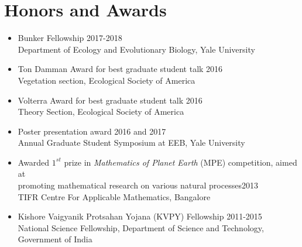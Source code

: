 \documentclass[11pt,a4paper,sans]{moderncv}        %
\begin{document}
\section{Honors and Awards}
\begin{itemize}

\item Bunker Fellowship \hfill 2017-2018\\ 
{\footnotesize Department of Ecology and Evolutionary Biology, Yale University}\\

\item Ton Damman Award for best graduate student talk  \hfill 2016\\ 
{\footnotesize Vegetation section, Ecological Society of America}\\

\item Volterra Award for best graduate student talk \hfill 2016\\
{\footnotesize Theory Section, Ecological Society of America}\\

\item Poster presentation award  \hfill 2016 and 2017\\
{\footnotesize Annual Graduate Student Symposium at EEB, Yale University}\\

\item Awarded \emph{$1^{st}$} prize in \emph{Mathematics of Planet Earth} (MPE) competition, aimed at\\ promoting mathematical research on various natural processes\hfill 2013\\
{\footnotesize TIFR Centre For Applicable Mathematics, Bangalore}\\
\item  Kishore Vaigyanik Protsahan Yojana (KVPY) Fellowship \hfill 2011-2015\\
{\footnotesize National Science Fellowship, Department of Science and Technology, Government of India}\\
  
\end{itemize}
\end{document}

